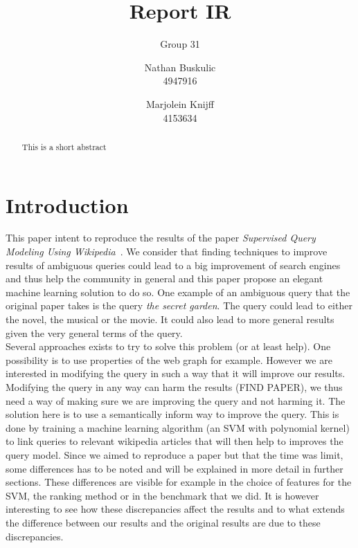 \documentclass[sigconf]{acmart}
\begin{document}
\title{Report IR}
\subtitle{Group 31}


\author{Nathan Buskulic \\ 4947916}

\author{Marjolein Knijff \\ 4153634}

\begin{abstract}
  This is a short abstract
\end{abstract}

\maketitle



\section{Introduction}

This paper intent to reproduce the results of the paper \textit{Supervised Query Modeling Using Wikipedia}~\cite{THEPaper}. We consider that finding techniques to improve results of ambiguous queries could lead to a big improvement of search engines and thus help the community in general and this paper propose an elegant machine learning solution to do so. One example of an ambiguous query that the original paper takes is the query \textit{the secret garden}. The query could lead to either the novel, the musical or the movie. It could also lead to more general results given the very general terms of the query.\\
Several approaches exists to try to solve this problem (or at least help). One possibility is to use properties of the web graph for example. However we are interested in modifying the query in such a way that it will improve our results. Modifying the query in any way can harm the results (FIND PAPER), we thus need a way of making sure we are improving the query and not harming it. The solution here is to use a semantically inform way to improve the query. This is done by training a machine learning algorithm (an SVM with polynomial kernel) to link queries to relevant wikipedia articles that will then help to improves the query model.
Since we aimed to reproduce a paper but that the time was limit, some differences has to be noted and will be explained in more detail in further sections. These differences are visible for example in the choice of features for the SVM, the ranking method or in the benchmark that we did. It is however interesting to see how these discrepancies affect the results and to what extends the difference between our results and the original results are due to these discrepancies.
\end{document}
